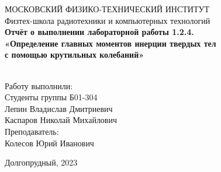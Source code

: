 \begin{center}
МОСКОВСКИЙ ФИЗИКО-ТЕХНИЧЕСКИЙ ИНСТИТУТ \\

\hfill \break
Физтех-школа радиотехники и компьютерных технологий\\
\vspace{5cm}
\large{\textbf{Отчёт о выполнении лабораторной работы 1.2.4. \\ «Определение главных моментов инерции твердых тел \\ с помощью крутильных колебаний»}}\\
\hfill \break
\\
\end{center}

\vspace{5cm}
 
\begin{flushright}
Работу выполнили:\\
Студенты группы Б01-304\\
Лепин Владислав Дмитриевич\\
Каспаров Николай Михайлович \\
Преподаватель:\\
Колесов Юрий Иванович\\
\end{flushright}
 
\vfill


\begin{center} Долгопрудный, 2023 \end{center}

\thispagestyle{empty}
\newpage